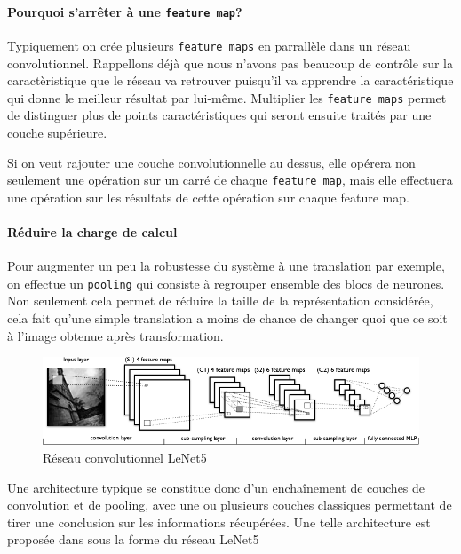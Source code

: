\documentclass[a4paper, 11pt, onecolumn]{article}
\begin{document}
\paragraph{Pourquoi s'arrêter à une \texttt{feature map}?}

Typiquement on crée plusieurs \texttt{feature maps} en parrallèle dans un réseau
convolutionnel. Rappellons déjà que nous n'avons pas beaucoup de contrôle sur la
caractèristique que le réseau va retrouver puisqu'il va apprendre la
caractéristique qui donne le meilleur résultat par lui-même. Multiplier les
\texttt{feature maps} permet de distinguer plus de points caractéristiques qui
seront ensuite traités par une couche supérieure.

Si on veut rajouter une couche convolutionnelle au dessus, elle opérera non
seulement une opération sur un carré de chaque \texttt{feature map}, mais elle
effectuera une opération sur les résultats de cette opération sur chaque feature
map.

\paragraph{Réduire la charge de calcul}

Pour augmenter un peu la robustesse du système à une translation par exemple, on
effectue un \texttt{pooling} qui consiste à regrouper ensemble des blocs de
neurones. Non seulement cela permet de réduire la taille de la représentation
considérée, cela fait qu'une simple translation a moins de chance de changer
quoi que ce soit à l'image obtenue après transformation.

\begin{figure}
  \centering
  \includegraphics[scale=0.8]{mylenet}
  \caption{Réseau convolutionnel LeNet5 \cite{lecun1998gradient}}
\end{figure}

Une architecture typique se constitue donc d'un enchaînement de couches de
convolution et de pooling, avec une ou plusieurs couches \og classiques\fg
permettant de tirer une conclusion sur les informations récupérées. Une telle
architecture est proposée dans \cite{lecun1998gradient} sous la forme du réseau LeNet5
\end{document}

